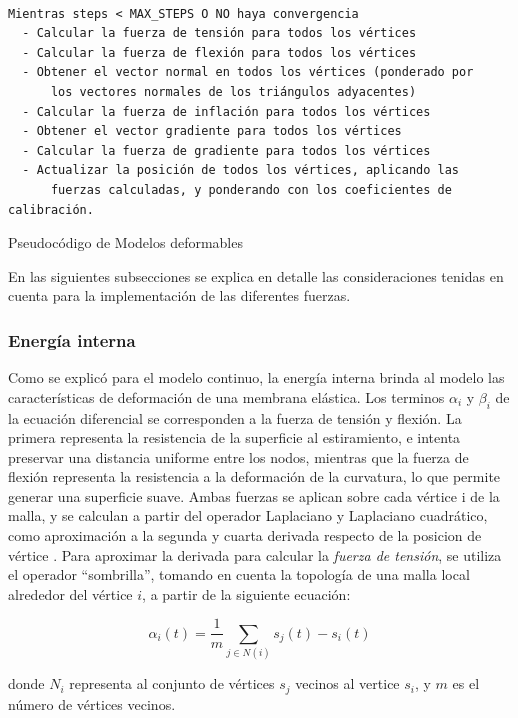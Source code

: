 \begin{program}
\begin{verbatim}

Mientras steps < MAX_STEPS O NO haya convergencia
  - Calcular la fuerza de tensión para todos los vértices
  - Calcular la fuerza de flexión para todos los vértices
  - Obtener el vector normal en todos los vértices (ponderado por 
      los vectores normales de los triángulos adyacentes)
  - Calcular la fuerza de inflación para todos los vértices
  - Obtener el vector gradiente para todos los vértices
  - Calcular la fuerza de gradiente para todos los vértices
  - Actualizar la posición de todos los vértices, aplicando las 
      fuerzas calculadas, y ponderando con los coeficientes de calibración.
\end{verbatim}
\caption{Pseudocódigo de Modelos deformables}
\label{alg:modelos_deformables}
\end{program}

En las siguientes subsecciones se explica en detalle las consideraciones tenidas en cuenta para la implementación de las diferentes fuerzas.

\subsubsection{Energía interna}\label{section:energia_interna}
Como se explicó para el modelo continuo, la energía interna brinda al modelo las características de deformación de una membrana elástica. Los terminos $\alpha_{i}$ y $\beta_{i}$ de la ecuación diferencial se corresponden a la fuerza de tensión y flexión. La primera representa la resistencia de la superficie al estiramiento, e intenta preservar una distancia uniforme entre los nodos, mientras que la fuerza de flexión representa la resistencia a la deformación de la curvatura, lo que permite generar una superficie suave. Ambas fuerzas se aplican sobre cada vértice i de la malla, y se calculan a partir del operador Laplaciano y Laplaciano cuadrático, como aproximación a la segunda y cuarta derivada respecto de la posicion de vértice \citep{mcinerney2000t}. Para aproximar la derivada para calcular la \emph{fuerza de tensión}, se utiliza el operador “sombrilla”, tomando en cuenta la topología de una malla local alrededor del vértice $i$, a partir de la siguiente ecuación:

$$ \alpha_{i}(t) = \dfrac{1}{m}\sum_{j\in N(i)} s_{j}(t) - s_{i}(t) $$

donde $N_{i}$ representa al conjunto de vértices $s_{j}$ vecinos al vertice $s_{i}$, y $m$ es el número de vértices  vecinos.

